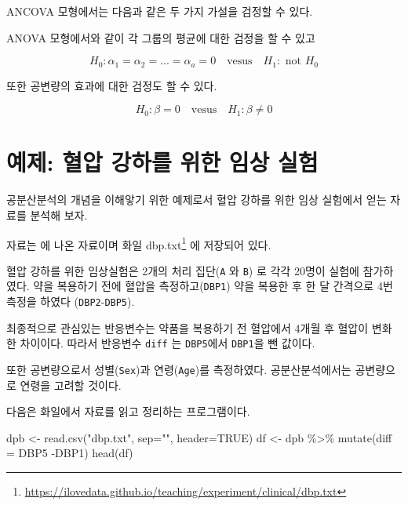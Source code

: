 \documentclass[
]{book}
\newenvironment{Shaded}{\begin{snugshade}}{\end{snugshade}}
\newcommand{\AttributeTok}[1]{\textcolor[rgb]{0.77,0.63,0.00}{#1}}
\newcommand{\ConstantTok}[1]{\textcolor[rgb]{0.00,0.00,0.00}{#1}}
\newcommand{\FunctionTok}[1]{\textcolor[rgb]{0.00,0.00,0.00}{#1}}
\newcommand{\NormalTok}[1]{#1}
\newcommand{\OtherTok}[1]{\textcolor[rgb]{0.56,0.35,0.01}{#1}}
\newcommand{\SpecialCharTok}[1]{\textcolor[rgb]{0.00,0.00,0.00}{#1}}
\newcommand{\StringTok}[1]{\textcolor[rgb]{0.31,0.60,0.02}{#1}}
\renewcommand{\href}[2]{#2\footnote{\url{#1}}}
\begin{document}
ANCOVA 모형에서는 다음과 같은 두 가지 가설을 검정할 수 있다.

ANOVA 모형에서와 같이 각 그룹의 평균에 대한 검정을 할 수 있고

\begin{equation*}
H_0: \alpha_1 = \alpha_2 =...=\alpha_a =0  \quad \text{vesus} \quad H_1: \text{ not } H_0 
\end{equation*}

또한 공변량의 효과에 대한 검정도 할 수 있다.

\begin{equation} 
H_0: \beta =0  \quad \text{vesus} \quad H_1: \beta \ne 0 
\label{eq:hypoancova}
\end{equation}

\hypertarget{uxc608uxc81c-uxd608uxc555-uxac15uxd558uxb97c-uxc704uxd55c-uxc784uxc0c1-uxc2e4uxd5d8}{%
\section{예제: 혈압 강하를 위한 임상 실험}\label{uxc608uxc81c-uxd608uxc555-uxac15uxd558uxb97c-uxc704uxd55c-uxc784uxc0c1-uxc2e4uxd5d8}}

공분산분석의 개념을 이해앟기 위한 예제로서 혈압 강하를 위한 임상 실험에서 얻는 자료를 분석해 보자.

자료는 \citep{chen2017clinical} 에 나온 자료이며 화일 \href{https://ilovedata.github.io/teaching/experiment/clinical/dbp.txt}{dbp.txt} 에 저장되어 있다.

혈압 강하를 위한 임상실험은 2개의 처리 집단(\texttt{A} 와 \texttt{B}) 로 각각 20명이 실험에 참가하였다. 약을 복용하기 전에 혈압을 측정하고(\texttt{DBP1}) 약을 복용한 후 한 달 간격으로 4번 측정을 하였다 (\texttt{DBP2}-\texttt{DBP5}).

최종적으로 관심있는 반응변수는 약품을 복용하기 전 혈압에서 4개월 후 혈압이 변화한 차이이다.
따라서 반응변수 \texttt{diff} 는 \texttt{DBP5}에서 \texttt{DBP1}을 뺀 값이다.

또한 공변량으로서 성별(\texttt{Sex})과 연령(\texttt{Age})를 측정하였다. 공분산분석에서는 공변량으로 연령을 고려할 것이다.

다음은 화일에서 자료를 읽고 정리하는 프로그램이다.

\begin{Shaded}
\begin{Highlighting}[]
\NormalTok{dpb }\OtherTok{\textless{}{-}} \FunctionTok{read.csv}\NormalTok{(}\StringTok{"dbp.txt"}\NormalTok{, }\AttributeTok{sep=}\StringTok{""}\NormalTok{, }\AttributeTok{header=}\ConstantTok{TRUE}\NormalTok{)}
\NormalTok{df }\OtherTok{\textless{}{-}}\NormalTok{ dpb }\SpecialCharTok{\%\textgreater{}\%} \FunctionTok{mutate}\NormalTok{(}\AttributeTok{diff =}\NormalTok{ DBP5 }\SpecialCharTok{{-}}\NormalTok{DBP1)}
\FunctionTok{head}\NormalTok{(df)}
\end{Highlighting}
\end{Shaded}
\end{document}
